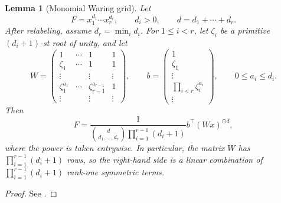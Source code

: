 \documentclass[11pt]{article}
\newtheorem{lemma}[theorem]{Lemma}
\theoremstyle{definition}
\begin{document}
\begin{lemma}[Monomial Waring grid]\label{lem:waring-monomial-matrix}
  Let
  \[
    F=x_1^{d_1}\cdots x_r^{d_r},
    \qquad
    d_i>0,
    \qquad
    d=d_1+\cdots+d_r.
  \]
  After relabeling, assume $d_r=\min_i d_i$.  For $1\le i<r$, let $\zeta_i$ be a primitive $(d_i+1)$-st root of unity, and let
  \[
    W=
    \begin{pmatrix}
      1 & \cdots & 1 & 1 \\
      \zeta_1 & \cdots & 1 & 1 \\
      \vdots & & \vdots & \vdots \\
      \zeta_1^{a_1} & \cdots & \zeta_{r-1}^{a_{r-1}} & 1 \\
      \vdots & & \vdots & \vdots
    \end{pmatrix},
    \qquad
    b=
    \begin{pmatrix}
      1\\
      \zeta_1\\
      \vdots\\
      \prod_{i<r}\zeta_i^{a_i}\\
      \vdots
    \end{pmatrix},
    \qquad
    0\le a_i\le d_i.
  \]
  Then
  \begin{equation}\label{eq:waring-monomial}
    F
    =
    \frac{1}{
      \binom{d}{d_1,\dots,d_r}
      \prod_{i=1}^{r-1}(d_i+1)}
    b^\top (Wx)^{\odot d},
  \end{equation}
  where the power is taken entrywise. In particular, the matrix $W$ has $\prod_{i=1}^{r-1}(d_i+1)$ rows, so the right-hand side is a linear combination of $ \prod_{i=1}^{r-1}(d_i+1) $ rank-one symmetric terms.
\end{lemma}
\begin{proof}
  See \cite[Eq.~(8)]{BBT2013}.
\end{proof}
\end{document}
